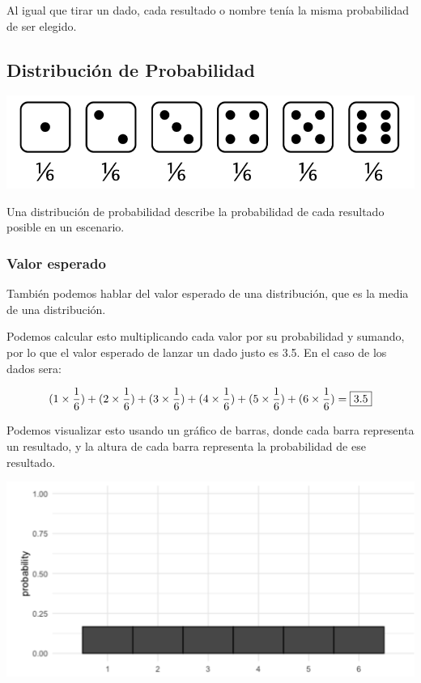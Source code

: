 \documentclass[
  letterpaper,
  DIV=11,
  numbers=noendperiod]{scrreprt}
\begin{document}
Al igual que tirar un dado, cada resultado o nombre tenía la misma
probabilidad de ser elegido.

\hypertarget{distribuciuxf3n-de-probabilidad}{%
\subsection{Distribución de
Probabilidad}\label{distribuciuxf3n-de-probabilidad}}

\includegraphics{fig20.png}

Una distribución de probabilidad describe la probabilidad de cada
resultado posible en un escenario.

\hypertarget{valor-esperado}{%
\subsubsection{Valor esperado}\label{valor-esperado}}

También podemos hablar del valor esperado de una distribución, que es la
media de una distribución.

Podemos calcular esto multiplicando cada valor por su probabilidad y
sumando, por lo que el valor esperado de lanzar un dado justo es 3.5. En
el caso de los dados sera:

\[
(1\times \frac{1}{6}) + (2\times \frac{1}{6}) + (3\times \frac{1}{6}) + (4\times \frac{1}{6}) + (5\times \frac{1}{6}) + (6\times \frac{1}{6}) = \fbox{3.5}
\]

Podemos visualizar esto usando un gráfico de barras, donde cada barra
representa un resultado, y la altura de cada barra representa la
probabilidad de ese resultado.

\includegraphics{fig21.png}
\end{document}
